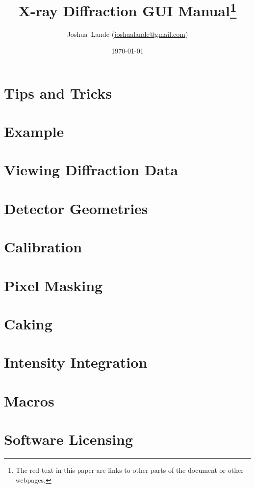 \documentclass[12pt]{book}
\begin{document}
\title{X-ray Diffraction GUI Manual\footnote{The red text in this paper are links to other parts of the document or other webpages.}}
\date{\today}
\author{Joshua~Lande (\href{mailto:joshualande@gmail.com}{joshualande@gmail.com})}

\setcounter{page}{1}

\maketitle

\tableofcontents

\chapter{Tips and Tricks}


\chapter{Example}


\chapter{Viewing Diffraction Data}\label{viewing_data}


\chapter{Detector Geometries}


\chapter{Calibration}\label{calibration}



\chapter{Pixel Masking}



\chapter{Caking}\label{Caking}


\chapter{Intensity Integration}


\chapter{Macros}


\chapter{Software Licensing}



 

\printindex
\end{document}
